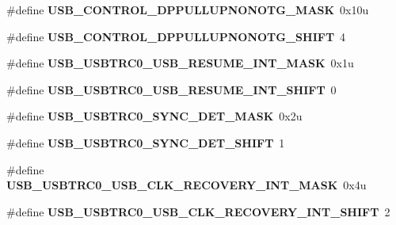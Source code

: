 \begin{DoxyCompactItemize}
\item 
\#define {\bfseries U\+S\+B\+\_\+\+C\+O\+N\+T\+R\+O\+L\+\_\+\+D\+P\+P\+U\+L\+L\+U\+P\+N\+O\+N\+O\+T\+G\+\_\+\+M\+A\+SK}~0x10u\hypertarget{group__USB__Register__Masks_ga764d9d972859eeded5e092a77eb4de79}{}\label{group__USB__Register__Masks_ga764d9d972859eeded5e092a77eb4de79}

\item 
\#define {\bfseries U\+S\+B\+\_\+\+C\+O\+N\+T\+R\+O\+L\+\_\+\+D\+P\+P\+U\+L\+L\+U\+P\+N\+O\+N\+O\+T\+G\+\_\+\+S\+H\+I\+FT}~4\hypertarget{group__USB__Register__Masks_ga5bae9683a5ae7c48617b8d24a35786ce}{}\label{group__USB__Register__Masks_ga5bae9683a5ae7c48617b8d24a35786ce}

\item 
\#define {\bfseries U\+S\+B\+\_\+\+U\+S\+B\+T\+R\+C0\+\_\+\+U\+S\+B\+\_\+\+R\+E\+S\+U\+M\+E\+\_\+\+I\+N\+T\+\_\+\+M\+A\+SK}~0x1u\hypertarget{group__USB__Register__Masks_ga9c943cc95fdf52fa40311292f2801518}{}\label{group__USB__Register__Masks_ga9c943cc95fdf52fa40311292f2801518}

\item 
\#define {\bfseries U\+S\+B\+\_\+\+U\+S\+B\+T\+R\+C0\+\_\+\+U\+S\+B\+\_\+\+R\+E\+S\+U\+M\+E\+\_\+\+I\+N\+T\+\_\+\+S\+H\+I\+FT}~0\hypertarget{group__USB__Register__Masks_ga48af1176ed5d811c299eb123f934425d}{}\label{group__USB__Register__Masks_ga48af1176ed5d811c299eb123f934425d}

\item 
\#define {\bfseries U\+S\+B\+\_\+\+U\+S\+B\+T\+R\+C0\+\_\+\+S\+Y\+N\+C\+\_\+\+D\+E\+T\+\_\+\+M\+A\+SK}~0x2u\hypertarget{group__USB__Register__Masks_ga2e2f3b4bb79885ed92d75c9f86d42e23}{}\label{group__USB__Register__Masks_ga2e2f3b4bb79885ed92d75c9f86d42e23}

\item 
\#define {\bfseries U\+S\+B\+\_\+\+U\+S\+B\+T\+R\+C0\+\_\+\+S\+Y\+N\+C\+\_\+\+D\+E\+T\+\_\+\+S\+H\+I\+FT}~1\hypertarget{group__USB__Register__Masks_ga986ea3386acad15ab845a8c5d9644c9e}{}\label{group__USB__Register__Masks_ga986ea3386acad15ab845a8c5d9644c9e}

\item 
\#define {\bfseries U\+S\+B\+\_\+\+U\+S\+B\+T\+R\+C0\+\_\+\+U\+S\+B\+\_\+\+C\+L\+K\+\_\+\+R\+E\+C\+O\+V\+E\+R\+Y\+\_\+\+I\+N\+T\+\_\+\+M\+A\+SK}~0x4u\hypertarget{group__USB__Register__Masks_ga588ecdb5189b26730014b09713a834db}{}\label{group__USB__Register__Masks_ga588ecdb5189b26730014b09713a834db}

\item 
\#define {\bfseries U\+S\+B\+\_\+\+U\+S\+B\+T\+R\+C0\+\_\+\+U\+S\+B\+\_\+\+C\+L\+K\+\_\+\+R\+E\+C\+O\+V\+E\+R\+Y\+\_\+\+I\+N\+T\+\_\+\+S\+H\+I\+FT}~2\hypertarget{group__USB__Register__Masks_ga10874c5a9f0c051773c2ed43af3375fe}{}\label{group__USB__Register__Masks_ga10874c5a9f0c051773c2ed43af3375fe}


\end{DoxyCompactItemize}
